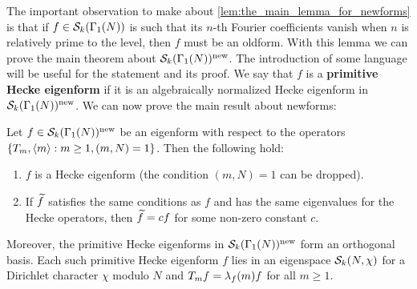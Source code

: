       The important observation to make about \cref{lem:the_main_lemma_for_newforms} is that if $f \in \mathcal{S}_{k}(\Gamma_{1}(N))$ is such that its $n$-th Fourier coefficients vanish when $n$ is relatively prime to the level, then $f$ must be an oldform. With this lemma we can prove the main theorem about $\mathcal{S}_{k}(\Gamma_{1}(N))^{\mathrm{new}}$. The introduction of some language will be useful for the statement and its proof. We say that $f$ is a \textbf{primitive Hecke eigenform} if it is an algebraically normalized Hecke eigenform in $\mathcal{S}_{k}(\Gamma_{1}(N))^{\mathrm{new}}$. We can now prove the main result about newforms:

      \begin{theorem}\label{thm:newforms_characterization}
        Let $f \in \mathcal{S}_{k}(\Gamma_{1}(N))^{\mathrm{new}}$ be an eigenform with respect to the operators $\{T_{m},\langle m\rangle:m \ge 1, (m,N) = 1\}$. Then the following hold:
        \begin{enumerate}[label=(\roman*)]
          \item $f$ is a Hecke eigenform (the condition $(m,N) = 1$ can be dropped).
          \item If $\widetilde{f}$ satisfies the same conditions as $f$ and has the same eigenvalues for the Hecke operators, then $\widetilde{f} = cf$ for some non-zero constant $c$.
        \end{enumerate}
        Moreover, the primitive Hecke eigenforms in $\mathcal{S}_{k}(\Gamma_{1}(N))^{\mathrm{new}}$ form an orthogonal basis. Each such primitive Hecke eigenform $f$ lies in an eigenspace $\mathcal{S}_{k}(N,\chi)$ for a Dirichlet character $\chi$ modulo $N$ and $T_{m}f = \lambda_{f}(m)f$ for all $m \ge 1$.
      \end{theorem}
